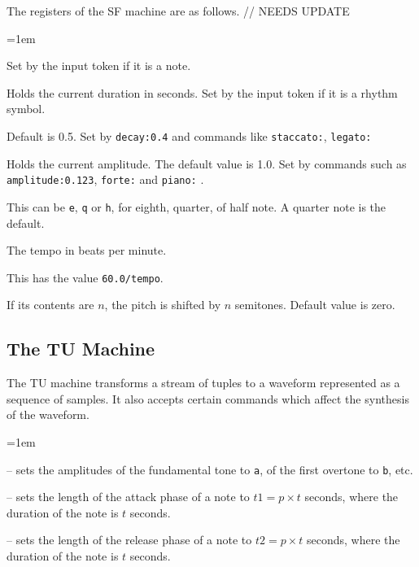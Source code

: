 \documentclass[11pt]{amsart}
\begin{document}
The registers of the SF machine are as follows. // NEEDS UPDATE

\begin{description}
    \parskip=1em
	\item[{\tt frequency}] Set by the input token if it is a note.
	
	\item[{\tt duration}]  Holds the current duration in seconds.  Set by the input token if it
	        is a rhythm symbol.
	        
	\item[{\tt decay}] Default is 0.5. Set by {\tt decay:0.4} and commands like 
	{\tt staccato:}, {\tt legato:} 
	        
	\item[{\tt amplitude}] Holds the current amplitude.  The default value is 1.0.  Set by
	commands such as {\tt amplitude:0.123}, {\tt forte:} and {\tt piano:} .
	
	\item[{\tt beat}] This can be {\tt e}, {\tt q} or {\tt h}, for eighth, quarter, of half note.
	A quarter note is the default.
	
	\item[{\tt tempo}]  The tempo in beats per minute.  
	
	\item[{\tt beatDuration}] This has the value {\tt 60.0/tempo}.
	
	\item[{\tt transpose}]  If its contents are $n$, the pitch is shifted by
	$n$ semitones.  Default value is zero.

\end{description}



\subsection{The TU Machine}

The TU machine transforms a stream of tuples to a waveform represented as
a sequence of samples.  It also accepts certain commands which affect the 
synthesis of the waveform.

\begin{description}
  \parskip=1em
  \item[{\tt @harmonic:a:b:c:...}] -- sets the amplitudes of the fundamental tone
   to {\tt a}, of the first overtone to {\tt b}, etc.
   
  \item[{\tt @attack:p}] -- sets the length of the attack phase of a note to 
  $t1 = p\times t$ seconds, where the duration of the note is $t$ seconds.
  
  \item[{\tt @release:p}] -- sets the length of the release phase of a note to 
  $t2 = p\times t$ seconds, where the duration of the note is $t$ seconds.
  
\end{description}
\end{document}
